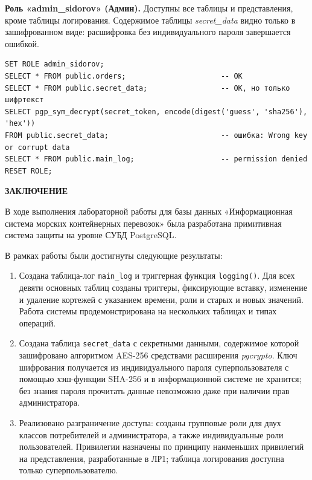 \documentclass[a4paper,14pt]{article}
\begin{document}
\textbf{Роль «admin\_sidorov» (Админ).} Доступны все таблицы и представления, кроме таблицы логирования. Содержимое таблицы \textit{secret\_data} видно только в зашифрованном виде: расшифровка без индивидуального пароля завершается ошибкой.

\begin{lstlisting}
SET ROLE admin_sidorov;
SELECT * FROM public.orders;                      -- OK
SELECT * FROM public.secret_data;                 -- OK, но только шифртекст
SELECT pgp_sym_decrypt(secret_token, encode(digest('guess', 'sha256'), 'hex'))
FROM public.secret_data;                          -- ошибка: Wrong key or corrupt data
SELECT * FROM public.main_log;                    -- permission denied
RESET ROLE;
\end{lstlisting}

\newpage
\begin{center}
    {\bfseries \MakeUppercase{Заключение}}
\end{center}

В ходе выполнения лабораторной работы для базы данных «Информационная система морских контейнерных перевозок» была разработана примитивная система защиты на уровне СУБД PostgreSQL.

В рамках работы были достигнуты следующие результаты:
\begin{enumerate}
    \item Создана таблица-лог \texttt{main\_log} и триггерная функция \texttt{logging()}. Для всех девяти основных таблиц созданы триггеры, фиксирующие вставку, изменение и удаление кортежей с указанием времени, роли и старых и новых значений. Работа системы продемонстрирована на нескольких таблицах и типах операций.
    \item Создана таблица \texttt{secret\_data} с секретными данными, содержимое которой зашифровано алгоритмом AES-256 средствами расширения \textit{pgcrypto}. Ключ шифрования получается из индивидуального пароля суперпользователя с помощью хэш-функции SHA-256 и в информационной системе не хранится; без знания пароля прочитать данные невозможно даже при наличии прав администратора.
    \item Реализовано разграничение доступа: созданы групповые роли для двух классов потребителей и администратора, а также индивидуальные роли пользователей. Привилегии назначены по принципу наименьших привилегий на представления, разработанные в ЛР1; таблица логирования доступна только суперпользователю.
\end{enumerate}
\end{document}
